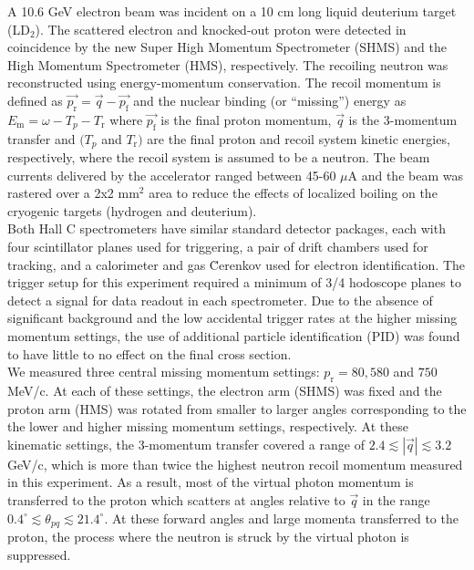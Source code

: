 \indent A 10.6 GeV electron beam was incident on a 10 cm long liquid deuterium target (LD$_{2}$). The scattered electron and knocked-out proton were detected in coincidence
by the new Super High Momentum Spectrometer (SHMS) and the High Momentum Spectrometer (HMS), respectively. The recoiling neutron was reconstructed using energy-momentum conservation. The recoil momentum is defined as 
$\vec{p_{\mathrm{r}}} = \vec{q} - \vec{p_{\mathrm{f}}}$ and the nuclear binding (or ``missing'') energy as $E_{\mathrm{m}} = \omega - T_{p} - T_{\mathrm{r}}$ where $\vec{p_{\mathrm{f}}}$ is the final proton momentum, $\vec{q}$ is the 3-momentum transfer and $(T_{p}$ and $T_{\mathrm{r}})$ are the
final proton and recoil system kinetic energies, respectively, where the recoil system is assumed to be a neutron. The beam currents delivered by the accelerator ranged between 45-60 $\mu$A and the beam was rastered over a 2x2 mm$^{2}$ area to reduce the effects of localized boiling on the cryogenic targets (hydrogen and deuterium).\\
\indent Both Hall C spectrometers have similar standard detector packages, each with four scintillator planes \cite{hodo_techreport} used for triggering, a pair of drift chambers \cite{dc_techreport} used for tracking, and a calorimeter \cite{Mkrtchyan_2013} and gas \u{C}erenkov \cite{Li_Wenliang_mthesis,ngc_techreport} used for electron identification.
The trigger setup for this experiment required a minimum of 3/4 hodoscope planes to detect a signal for data readout in each spectrometer. Due to the absence of significant background and the low
accidental trigger rates at the higher missing momentum settings, the use of additional particle identification (PID) was found to have little to no effect on the final cross section.\\
\indent We measured three central missing momentum settings: $p_{\mathrm{r}}=80, 580$ and $750$ MeV/c. At each of these settings, the electron arm (SHMS) was fixed and the proton arm (HMS) was rotated from smaller to larger angles corresponding to the
the lower and higher missing momentum settings, respectively. At these kinematic settings, the 3-momentum transfer covered a range of $2.4\lesssim|\vec{q}|\lesssim3.2$ GeV/c, which is more than twice the highest neutron recoil momentum
measured in this experiment. As a result, most of the virtual photon momentum is transferred to the proton which scatters at angles relative to $\vec{q}$ in the range $0.4^{\circ}\lesssim \theta_{pq}\lesssim21.4^{\circ}$.
At these forward angles and large momenta transferred to the proton, the  process where the neutron is struck by the virtual photon is suppressed.\\
